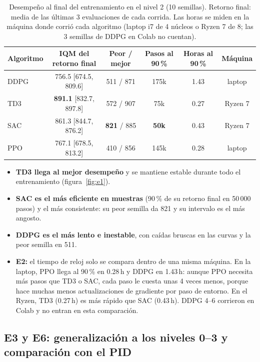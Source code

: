 \documentclass[11pt,a4paper]{article}
\newcommand{\best}[1]{\textbf{#1}}
\begin{document}
\begin{table}[H]
\centering
\caption{Desempeño al final del entrenamiento en el nivel 2 (10 semillas). Retorno final: media de las últimas 3 evaluaciones de cada corrida. Las horas se miden en la máquina donde corrió cada algoritmo (laptop i7 de 4 núcleos o Ryzen 7 de 8; las 3 semillas de DDPG en Colab no cuentan).}
\label{tab:e1}
\small
\begin{tabular}{@{}lccccc@{}}
\toprule
Algoritmo & IQM del retorno final & Peor / mejor & Pasos al 90\,\% & Horas al 90\,\% & Máquina \\
\midrule
DDPG & 756.5 [674.5, 809.6] & 511 / 871 & 175k & 1.43 & laptop \\
TD3 & \best{891.1} [832.7, 897.8] & 572 / 907 & 75k & 0.27 & Ryzen 7 \\
SAC & 861.3 [844.7, 876.2] & \best{821} / 885 & \best{50k} & 0.43 & Ryzen 7 \\
PPO & 767.1 [678.5, 813.2] & 410 / 856 & 145k & 0.28 & laptop \\
\bottomrule
\end{tabular}
\end{table}

\begin{itemize}
  \item \textbf{TD3 llega al mejor desempeño} y se mantiene estable durante todo el entrenamiento (figura~\ref{fig:e1}).
  \item \textbf{SAC es el más eficiente en muestras} (90\,\% de su retorno final en 50\,000 pasos) y el más consistente: su peor semilla da 821 y su intervalo es el más angosto.
  \item \textbf{DDPG es el más lento e inestable}, con caídas bruscas en las curvas y la peor semilla en 511.
  \item \textbf{E2:} el tiempo de reloj solo se compara dentro de una misma máquina. En la laptop, PPO llega al 90\,\% en 0.28\,h y DDPG en 1.43\,h: aunque PPO necesita más pasos que TD3 o SAC, cada paso le cuesta unas 4 veces menos, porque hace muchas menos actualizaciones de gradiente por paso de entorno. En el Ryzen, TD3 (0.27\,h) es más rápido que SAC (0.43\,h). DDPG 4--6 corrieron en Colab y no entran en esta comparación.
\end{itemize}

\subsection{E3 y E6: generalización a los niveles 0--3 y comparación con el PID}
\end{document}
